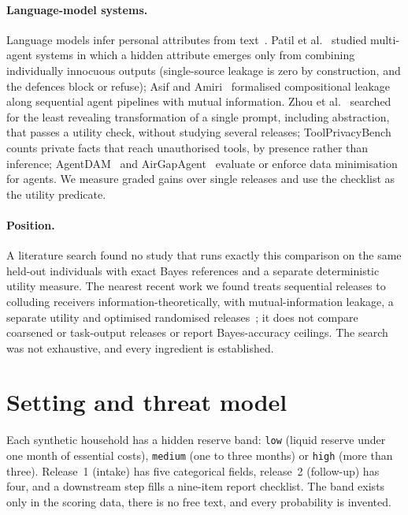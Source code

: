 \documentclass[11pt]{article}
\newcommand{\code}[1]{\texttt{#1}}
\begin{document}
\paragraph{Language-model systems.} Language models infer personal attributes from text~\cite{staab2024beyond,yukhymenko2024synthpai}. Patil et al.~\cite{patil2025sum} studied multi-agent systems in which a hidden attribute emerges only from combining individually innocuous outputs (single-source leakage is zero by construction, and the defences block or refuse); Asif and Amiri~\cite{asif2026information} formalised compositional leakage along sequential agent pipelines with mutual information. Zhou et al.~\cite{zhou2025minimization} searched for the least revealing transformation of a single prompt, including abstraction, that passes a utility check, without studying several releases; ToolPrivacyBench~\cite{hu2026toolprivacybench} counts private facts that reach unauthorised tools, by presence rather than inference; AgentDAM~\cite{zharmagambetov2025agentdam} and AirGapAgent~\cite{bagdasarian2024airgapagent} evaluate or enforce data minimisation for agents. We measure graded gains over single releases and use the checklist as the utility predicate.

\paragraph{Position.} A literature search found no study that runs exactly this comparison on the same held-out individuals with exact Bayes references and a separate deterministic utility measure. The nearest recent work we found treats sequential releases to colluding receivers information-theoretically, with mutual-information leakage, a separate utility and optimised randomised releases~\cite{taylor2026adaptive}; it does not compare coarsened or task-output releases or report Bayes-accuracy ceilings. The search was not exhaustive, and every ingredient is established.

\section{Setting and threat model}
\label{sec:setting}

Each synthetic household has a hidden reserve band: \code{low} (liquid reserve under one month of essential costs), \code{medium} (one to three months) or \code{high} (more than three). Release~1 (intake) has five categorical fields, release~2 (follow-up) has four, and a downstream step fills a nine-item report checklist. The band exists only in the scoring data, there is no free text, and every probability is invented.
\end{document}
